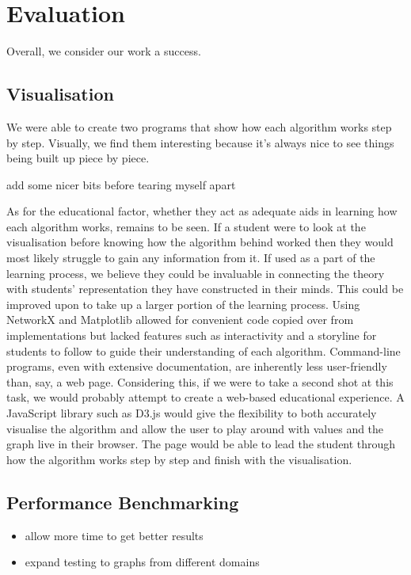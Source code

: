 \section{Evaluation}

Overall, we consider our work a success.

\subsection{Visualisation}

We were able to create two programs that show how each algorithm works step by
step. Visually, we find them interesting because it's always nice to see things
being built up piece by piece.

add some nicer bits before tearing myself apart

As for the educational factor, whether they act as adequate aids in learning
how each algorithm works, remains to be seen. If a student were to look at the
visualisation before knowing how the algorithm behind worked then they would
most likely struggle to gain any information from it. If used as a part of the
learning process, we believe they could be invaluable in connecting the theory
with students' representation they have constructed in their minds. This could
be improved upon to take up a larger portion of the learning process. Using
NetworkX and Matplotlib allowed for convenient code copied over from
implementations but lacked features such as interactivity and a storyline for
students to follow to guide their understanding of each algorithm. Command-line
programs, even with extensive documentation, are inherently less user-friendly
than, say, a web page. Considering this, if we were to take a second shot at
this task, we would probably attempt to create a web-based educational
experience. A JavaScript library such as D3.js \cite{bostock2011d3} would give
the flexibility to both accurately visualise the algorithm and allow the user
to play around with values and the graph live in their browser. The page would
be able to lead the student through how the algorithm works step by step and
finish with the visualisation.

\subsection{Performance Benchmarking}

\begin{itemize}
    \item
          allow more time to get better results
    \item
          expand testing to graphs from different domains
\end{itemize}

